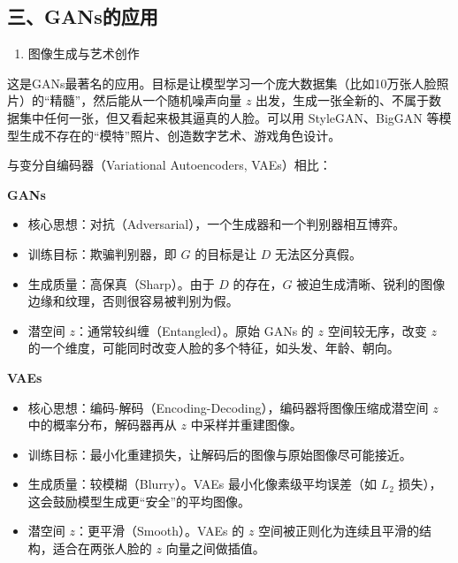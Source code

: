 \hypertarget{ux4e09gansux7684ux5e94ux7528}{%
\subsection{三、GANs的应用}\label{ux4e09gansux7684ux5e94ux7528}}

\begin{enumerate}
\def\labelenumi{\arabic{enumi}.}
\tightlist
\item
  图像生成与艺术创作
\end{enumerate}

这是GANs最著名的应用。目标是让模型学习一个庞大数据集（比如10万张人脸照片）的``精髓''，然后能从一个随机噪声向量 \(z\) 出发，生成一张全新的、不属于数据集中任何一张，但又看起来极其逼真的人脸。可以用 StyleGAN、BigGAN 等模型生成不存在的``模特''照片、创造数字艺术、游戏角色设计。

与变分自编码器（Variational Autoencoders, VAEs）相比：

\textbf{GANs}

\begin{itemize}
\tightlist
\item
  核心思想：对抗（Adversarial），一个生成器和一个判别器相互博弈。
\item
  训练目标：欺骗判别器，即 \(G\) 的目标是让 \(D\) 无法区分真假。
\item
  生成质量：高保真（Sharp）。由于 \(D\) 的存在，\(G\) 被迫生成清晰、锐利的图像边缘和纹理，否则很容易被判别为假。
\item
  潜空间 \(z\)：通常较纠缠（Entangled）。原始 GANs 的 \(z\) 空间较无序，改变 \(z\) 的一个维度，可能同时改变人脸的多个特征，如头发、年龄、朝向。
\end{itemize}

\textbf{VAEs}

\begin{itemize}
\tightlist
\item
  核心思想：编码-解码（Encoding-Decoding），编码器将图像压缩成潜空间 \(z\) 中的概率分布，解码器再从 \(z\) 中采样并重建图像。
\item
  训练目标：最小化重建损失，让解码后的图像与原始图像尽可能接近。
\item
  生成质量：较模糊（Blurry）。VAEs 最小化像素级平均误差（如 \(L_2\) 损失），这会鼓励模型生成更``安全''的平均图像。
\item
  潜空间 \(z\)：更平滑（Smooth）。VAEs 的 \(z\) 空间被正则化为连续且平滑的结构，适合在两张人脸的 \(z\) 向量之间做插值。
\end{itemize}

